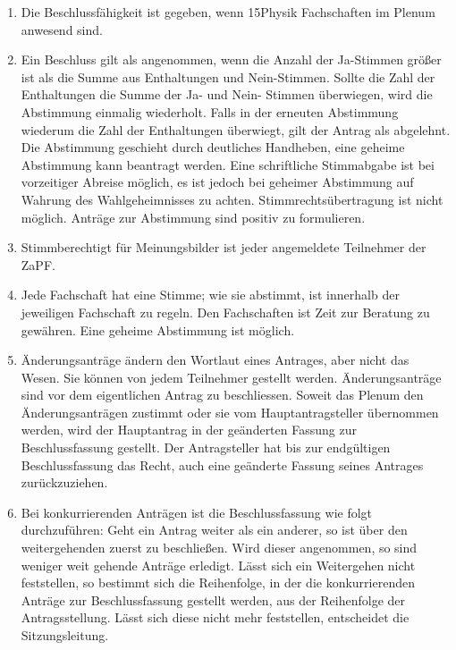 \documentclass[draft,12pt,oneside]{scrreprt}
\begin{document}
\begin{enumerate}
  \item Die Beschlussfähigkeit ist gegeben, wenn 15\footnotemark Physik Fachschaften
        im Plenum anwesend sind.

  \item Ein Beschluss gilt als angenommen, wenn die Anzahl der Ja-Stimmen größer
        ist als die Summe aus Enthaltungen und Nein-Stimmen.
        Sollte die Zahl der Enthaltungen die Summe der Ja- und Nein- Stimmen
        überwiegen, wird die Abstimmung einmalig wiederholt.
        Falls in der erneuten Abstimmung wiederum die Zahl der Enthaltungen
        überwiegt, gilt der Antrag als abgelehnt.
        Die Abstimmung geschieht durch deutliches Handheben, eine geheime
        Abstimmung kann beantragt werden.
        Eine schriftliche Stimmabgabe ist bei vorzeitiger Abreise möglich, es ist
        jedoch bei geheimer Abstimmung auf Wahrung des Wahlgeheimnisses zu achten.
        Stimmrechtsübertragung ist nicht möglich.
        Anträge zur Abstimmung sind positiv zu formulieren.

  \item Stimmberechtigt für Meinungsbilder ist jeder angemeldete Teilnehmer der
        ZaPF.

  \item Jede Fachschaft hat eine Stimme; wie sie abstimmt, ist innerhalb der
        jeweiligen Fachschaft zu regeln.
        Den Fachschaften ist Zeit zur Beratung zu gewähren.
        Eine geheime Abstimmung ist möglich.

  \item Änderungsanträge ändern den Wortlaut eines Antrages, aber nicht das Wesen.
        Sie können von jedem Teilnehmer gestellt werden.
        Änderungsanträge sind vor dem eigentlichen Antrag zu beschliessen.
        Soweit das Plenum den Änderungsanträgen zustimmt oder sie vom
        Hauptantragsteller übernommen werden, wird der Hauptantrag in der
        geänderten Fassung zur Beschlussfassung gestellt.
        Der Antragsteller hat bis zur endgültigen Beschlussfassung das Recht,
        auch eine geänderte Fassung seines Antrages zurückzuziehen.

  \item Bei konkurrierenden Anträgen ist die Beschlussfassung wie folgt durchzuführen:
        Geht ein Antrag weiter als ein anderer, so ist über den weitergehenden
        zuerst zu beschließen.
        Wird dieser angenommen, so sind weniger weit gehende Anträge erledigt.
        Lässt sich ein Weitergehen nicht feststellen, so bestimmt sich die
        Reihenfolge, in der die konkurrierenden Anträge zur Beschlussfassung
        gestellt werden, aus der Reihenfolge der Antragsstellung.
        Lässt sich diese nicht mehr feststellen, entscheidet die Sitzungsleitung.


\end{enumerate}
\end{document}
